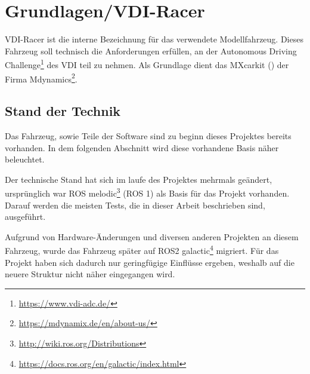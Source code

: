 \section{Grundlagen/VDI-Racer %
}
\label{sec:grundlagen}

VDI-Racer ist die interne Bezeichnung für das verwendete Modellfahrzeug. Dieses Fahrzeug soll technisch die Anforderungen erfüllen, an der Autonomous Driving Challenge\footnote{\url{https://www.vdi-adc.de/}} des VDI teil zu nehmen. Als Grundlage dient das MXcarkit (\cite{MXcarkitSpec}) der Firma Mdynamics\footnote{\url{https://mdynamix.de/en/about-us/}}.

\subsection{Stand der Technik}
Das Fahrzeug, sowie Teile der Software sind zu beginn dieses Projektes bereits vorhanden. In dem folgenden Abschnitt wird diese vorhandene Basis näher beleuchtet.

Der technische Stand hat sich im laufe des Projektes mehrmals geändert, ursprünglich war ROS melodic\footnote{\url{http://wiki.ros.org/Distributions}} (ROS 1) als Basis für das Projekt vorhanden. Darauf werden die meisten Tests, die in dieser Arbeit beschrieben sind, ausgeführt.

Aufgrund von Hardware-Änderungen und diversen anderen Projekten an diesem Fahrzeug, wurde das Fahrzeug später auf ROS2 galactic\footnote{\url{https://docs.ros.org/en/galactic/index.html}} migriert. Für das Projekt haben sich dadurch nur geringfügige Einflüsse ergeben, weshalb auf die neuere Struktur nicht näher eingegangen wird.


